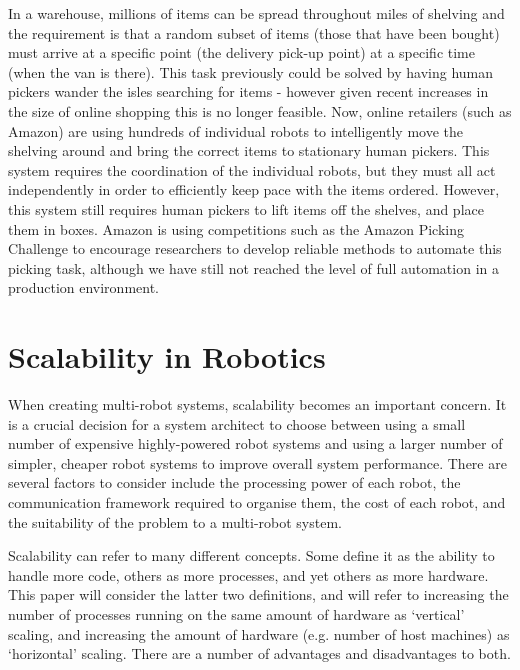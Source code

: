 \documentclass[../dissertation.tex]{subfiles}
\begin{document}
In a warehouse, millions of items can be spread throughout miles of shelving and the requirement is that a random subset of items (those that have been bought) must arrive at a specific point (the delivery pick-up point) at a specific time (when the van is there). This task previously could be solved by having human pickers wander the isles searching for items - however given recent increases in the size of online shopping this is no longer feasible. Now, online retailers (such as Amazon) are using hundreds of individual robots to intelligently move the shelving around and bring the correct items to stationary human pickers\cite{wurman2008coordinating}. This system requires the coordination of the individual robots, but they must all act independently in order to efficiently keep pace with the items ordered. However, this system still requires human pickers to lift items off the shelves, and place them in boxes. Amazon is using competitions such as the Amazon Picking Challenge to encourage researchers to develop reliable methods to automate this picking task\cite{correll2016lessons}, although we have still not reached the level of full automation in a production environment.

\section{Scalability in Robotics}
\label{background-scalability}

When creating multi-robot systems, scalability becomes an important concern\cite{klavins2004communication}. It is a crucial decision for a system architect to choose between using a small number of expensive highly-powered robot systems and using a larger number of simpler, cheaper robot systems to improve overall system performance. There are several factors to consider include the processing power of each robot, the communication framework required to organise them, the cost of each robot, and the suitability of the problem to a multi-robot system.

Scalability can refer to many different concepts. Some define it as the ability to handle more code, others as more processes, and yet others as more hardware\cite{Bondi:2000:CSI:350391.350432}. This paper will consider the latter two definitions, and will refer to increasing the number of processes running on the same amount of hardware as `vertical' scaling, and increasing the amount of hardware (e.g. number of host machines) as `horizontal' scaling. There are a number of advantages and disadvantages to both.
\end{document}
